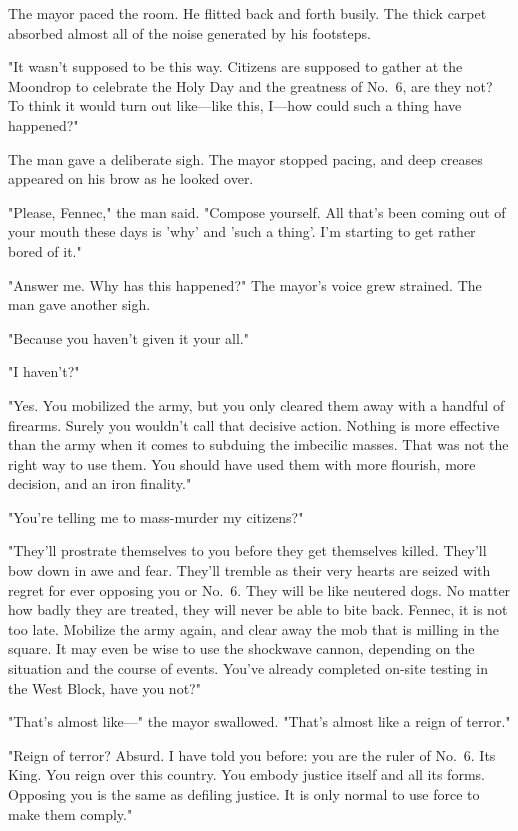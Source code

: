 The mayor paced the room. He flitted back and forth busily. The thick
carpet absorbed almost all of the noise generated by his footsteps.

"It wasn't supposed to be this way. Citizens are supposed to gather at
the Moondrop to celebrate the Holy Day and the greatness of No.~6, are
they not? To think it would turn out like---like this, I---how could such a
thing have happened?"

The man gave a deliberate sigh. The mayor stopped pacing, and deep
creases appeared on his brow as he looked over.

"Please, Fennec," the man said. "Compose yourself. All that's been
coming out of your mouth these days is 'why' and 'such a thing'. I'm
starting to get rather bored of it."

"Answer me. Why has this happened?" The mayor's voice grew strained. The
man gave another sigh.

"Because you haven't given it your all."

"I haven't?"

"Yes. You mobilized the army, but you only cleared them away with a
handful of firearms. Surely you wouldn't call that decisive action.
Nothing is more effective than the army when it comes to subduing the
imbecilic masses. That was not the right way to use them. You should
have used them with more flourish, more decision, and an iron finality."

"You're telling me to mass-murder my citizens?"

"They'll prostrate themselves to you before they get themselves killed.
They'll bow down in awe and fear. They'll tremble as their very hearts
are seized with regret for ever opposing you or No.~6. They will be like
neutered dogs. No matter how badly they are treated, they will never be
able to bite back. Fennec, it is not too late. Mobilize the army again,
and clear away the mob that is milling in the square. It may even be
wise to use the shockwave cannon, depending on the situation and the
course of events. You've already completed on-site testing in the West
Block, have you not?"

"That's almost like---" the mayor swallowed. "That's almost like a reign
of terror."

"Reign of terror? Absurd. I have told you before: you are the ruler of
No.~6. Its King. You reign over this country. You embody justice itself
and all its forms. Opposing you is the same as defiling justice. It is
only normal to use force to make them comply."

